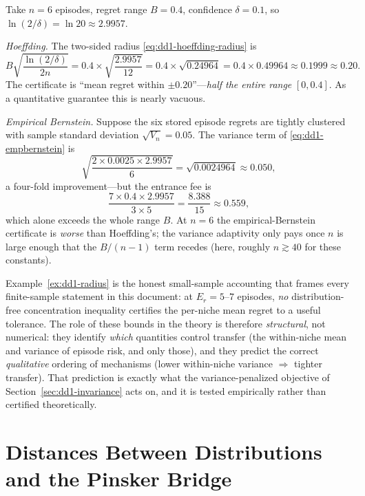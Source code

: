 \begin{example}
\label{ex:dd1-radius}
Take $n = 6$ episodes, regret range $B = 0.4$, confidence $\delta = 0.1$, so
$\ln(2/\delta) = \ln 20 \approx 2.9957$.

\emph{Hoeffding.} The two-sided radius \eqref{eq:dd1-hoeffding-radius} is
\[
B \sqrt{\frac{\ln(2/\delta)}{2n}}
= 0.4 \times \sqrt{\frac{2.9957}{12}}
= 0.4 \times \sqrt{0.24964}
= 0.4 \times 0.49964
\approx 0.1999 \approx 0.20 .
\]
The certificate is ``mean regret within $\pm 0.20$''---\emph{half the entire
range} $[0, 0.4]$. As a quantitative guarantee this is nearly vacuous.

\emph{Empirical Bernstein.} Suppose the six stored episode regrets are
tightly clustered with sample standard deviation $\sqrt{V_n} = 0.05$. The
variance term of \eqref{eq:dd1-empbernstein} is
\[
\sqrt{\frac{2 \times 0.0025 \times 2.9957}{6}}
= \sqrt{0.0024964} \approx 0.050,
\]
a four-fold improvement---but the entrance fee is
\[
\frac{7 \times 0.4 \times 2.9957}{3 \times 5}
= \frac{8.388}{15} \approx 0.559,
\]
which alone exceeds the whole range $B$. At $n = 6$ the empirical-Bernstein
certificate is \emph{worse} than Hoeffding's; the variance adaptivity only
pays once $n$ is large enough that the $B/(n-1)$ term recedes (here, roughly
$n \gtrsim 40$ for these constants).
\end{example}

\begin{warning}
Example~\ref{ex:dd1-radius} is the honest small-sample accounting that frames
every finite-sample statement in this document: at $E_r = 5$--$7$ episodes,
\emph{no} distribution-free concentration inequality certifies the per-niche
mean regret to a useful tolerance. The role of these bounds in the \nm{}
theory is therefore \emph{structural}, not numerical: they identify
\emph{which} quantities control transfer (the within-niche mean and
variance of episode risk, and only those), and they predict the correct
\emph{qualitative} ordering of mechanisms (lower within-niche variance
$\Rightarrow$ tighter transfer). That prediction is exactly what the
variance-penalized objective of Section~\ref{sec:dd1-invariance} acts on, and
it is tested empirically rather than certified theoretically.
\end{warning}

\section{Distances Between Distributions and the Pinsker Bridge}
\label{sec:dd1-distances}

